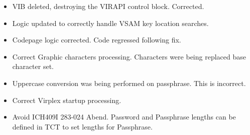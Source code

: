 \documentclass[letterpaper,10pt,english]{sphinxmanual}
\begin{document}
\begin{itemize}
\item {} 
VIB deleted, destroying the VIRAPI control block. Corrected.

\end{itemize}

\begin{itemize}
\item {} 
Logic updated to correctly handle VSAM key location searches.

\end{itemize}

\begin{itemize}
\item {} 
Codepage logic corrected. Code regressed following fix.

\end{itemize}

\begin{itemize}
\item {} 
Correct Graphic characters processing. Characters were being replaced base character set.

\end{itemize}

\begin{itemize}
\item {} 
Uppercase conversion was being performed on passphrase. This is incorrect.

\end{itemize}

\begin{itemize}
\item {} 
Correct Virplex startup processing.

\end{itemize}

\begin{itemize}
\item {} 
Avoid ICH409I 283-024 Abend. Password and Passphrase lengths can be defined in TCT to set lengths for Passphrase.

\end{itemize}
\end{document}
